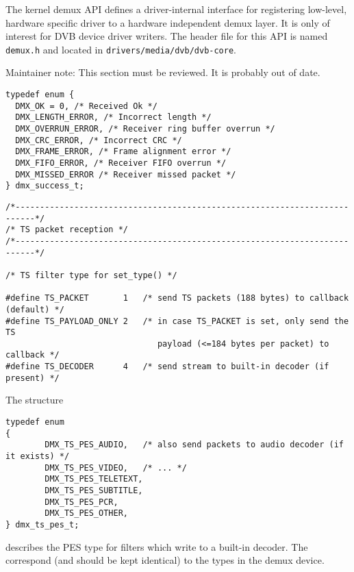 
The kernel demux API defines a driver-internal interface
for registering low-level, hardware specific driver to a
hardware independent demux layer. It is only of interest
for DVB device driver writers. The header file for this
API is named \texttt{demux.h} and located in
\texttt{drivers/media/dvb/dvb-core}.

Maintainer note: This section must be reviewed. It is probably out of date.


\label{dmxsuccesst}

\begin{verbatim}
typedef enum { 
  DMX_OK = 0, /* Received Ok */ 
  DMX_LENGTH_ERROR, /* Incorrect length */ 
  DMX_OVERRUN_ERROR, /* Receiver ring buffer overrun */ 
  DMX_CRC_ERROR, /* Incorrect CRC */ 
  DMX_FRAME_ERROR, /* Frame alignment error */ 
  DMX_FIFO_ERROR, /* Receiver FIFO overrun */ 
  DMX_MISSED_ERROR /* Receiver missed packet */ 
} dmx_success_t; 
\end{verbatim}


\label{tsfiltertypes}

\begin{verbatim}
/*--------------------------------------------------------------------------*/ 
/* TS packet reception */ 
/*--------------------------------------------------------------------------*/

/* TS filter type for set_type() */

#define TS_PACKET       1   /* send TS packets (188 bytes) to callback (default) */ 
#define TS_PAYLOAD_ONLY 2   /* in case TS_PACKET is set, only send the TS
                               payload (<=184 bytes per packet) to callback */
#define TS_DECODER      4   /* send stream to built-in decoder (if present) */
\end{verbatim}


\label{dmxtspest}

The structure 
\begin{verbatim}
typedef enum
{
        DMX_TS_PES_AUDIO,   /* also send packets to audio decoder (if it exists) */
        DMX_TS_PES_VIDEO,   /* ... */
        DMX_TS_PES_TELETEXT,
        DMX_TS_PES_SUBTITLE,
        DMX_TS_PES_PCR,
        DMX_TS_PES_OTHER,
} dmx_ts_pes_t;
\end{verbatim}
describes the PES type for filters which write to
a built-in decoder. 
The correspond (and should be kept identical) to the types in 
the demux device.

